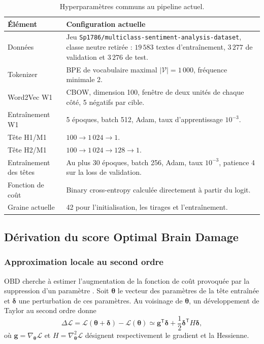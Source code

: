 \begin{table}[!ht]
    \centering
    \begin{tabularx}{\textwidth}{|l|X|}
        \hline
        Élément & Configuration actuelle \\ \hline
        Données & Jeu \texttt{Sp1786/multiclass-sentiment-analysis-dataset}, classe neutre retirée : $19\,583$ textes d'entraînement, $3\,277$ de validation et $3\,276$ de test. \\ \hline
        Tokenizer & BPE de vocabulaire maximal $|\mathcal{V}|=1\,000$, fréquence minimale 2. \\ \hline
        Word2Vec W1 & CBOW, dimension 100, fenêtre de deux unités de chaque côté, 5 négatifs par cible. \\ \hline
        Entraînement W1 & 5 époques, batch 512, Adam, taux d'apprentissage $10^{-3}$. \\ \hline
        Tête H1/M1 & $100\rightarrow1\,024\rightarrow1$. \\ \hline
        Tête H2/M1 & $100\rightarrow1\,024\rightarrow128\rightarrow1$. \\ \hline
        Entraînement des têtes & Au plus 30 époques, batch 256, Adam, taux $10^{-3}$, patience 4 sur la loss de validation. \\ \hline
        Fonction de coût & Binary cross-entropy calculée directement à partir du logit. \\ \hline
        Graine actuelle & 42 pour l'initialisation, les tirages et l'entraînement. \\ \hline
    \end{tabularx}
    \caption{Hyperparamètres communs au pipeline actuel.}
    \label{tab:hyperparametres_communs}
\end{table}

\subsection{Dérivation du score Optimal Brain Damage}
\label{ssec:methode_obd}

\subsubsection{Approximation locale au second ordre}

OBD cherche à estimer l'augmentation de la fonction de coût provoquée par la
suppression d'un paramètre \cite{lecun1989obd}. Soit
$\boldsymbol{\theta}$ le vecteur des paramètres de la tête entraînée et
$\boldsymbol{\delta}$ une perturbation de ces paramètres. Au voisinage de
$\boldsymbol{\theta}$, un développement de Taylor au second ordre donne
\begin{equation}
    \Delta\mathcal{L}
    =\mathcal{L}(\boldsymbol{\theta}+\boldsymbol{\delta})
     -\mathcal{L}(\boldsymbol{\theta})
    \simeq
    \boldsymbol{g}^{\mathsf{T}}\boldsymbol{\delta}
    +\frac{1}{2}
     \boldsymbol{\delta}^{\mathsf{T}}
     H\boldsymbol{\delta},
    \label{eq:taylor_obd}
\end{equation}
où $\boldsymbol{g}=\nabla_{\boldsymbol{\theta}}\mathcal{L}$ et
$H=\nabla_{\boldsymbol{\theta}}^2\mathcal{L}$ désignent respectivement le
gradient et la Hessienne.

